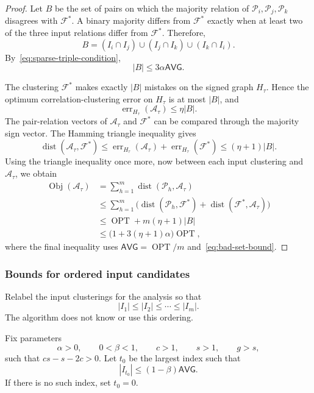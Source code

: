 \documentclass[11pt]{article}
\theoremstyle{definition}
\theoremstyle{remark}
\newcommand{\A}{\mathcal A}
\newcommand{\F}{\mathcal F}
\newcommand{\Pp}{\mathcal P}
\newcommand{\OPT}{\operatorname{OPT}}
\newcommand{\Obj}{\operatorname{Obj}}
\newcommand{\err}{\operatorname{err}}
\newcommand{\dist}{\operatorname{dist}}
\newcommand{\1}{\mathbf 1}
\begin{document}
\begin{proof}
Let $B$ be the set of pairs on which the majority relation of
$\Pp_i,\Pp_j,\Pp_k$ disagrees with $\F^*$.  A binary majority differs from
$\F^*$ exactly when at least two of the three input relations differ from
$\F^*$.  Therefore,
\begin{equation}\label{eq:bad-set-union}
 B=(I_i\cap I_j)\cup(I_j\cap I_k)\cup(I_k\cap I_i).
\end{equation}
By~\eqref{eq:sparse-triple-condition},
\begin{equation}\label{eq:bad-set-bound}
 |B|\le3\alpha\mathsf{AVG}.
\end{equation}

The clustering $\F^*$ makes exactly $|B|$ mistakes on the signed graph
$H_\tau$.  Hence the optimum correlation-clustering error on $H_\tau$ is at
most $|B|$, and
\[
  \err_{H_\tau}(\A_\tau)\le\eta|B|.
\]
The pair-relation vectors of $\A_\tau$ and $\F^*$ can be compared through
the majority sign vector.  The Hamming triangle inequality gives
\begin{equation}\label{eq:distance-through-majority}
 \dist(\A_\tau,\F^*)
 \le
 \err_{H_\tau}(\A_\tau)+\err_{H_\tau}(\F^*)
 \le(\eta+1)|B|.
\end{equation}
Using the triangle inequality once more, now between each input clustering
and $\A_\tau$, we obtain
\begin{align*}
 \Obj(\A_\tau)
 &=\sum_{h=1}^m\dist(\Pp_h,\A_\tau)\\
 &\le\sum_{h=1}^m
       \bigl(\dist(\Pp_h,\F^*)+\dist(\F^*,\A_\tau)\bigr)\\
 &\le\OPT+m(\eta+1)|B|\\
 &\le\bigl(1+3(\eta+1)\alpha\bigr)\OPT,
\end{align*}
where the final inequality uses
$\mathsf{AVG}=\OPT/m$ and~\eqref{eq:bad-set-bound}.
\end{proof}

\subsubsection{Bounds for ordered input candidates}

Relabel the input clusterings for the analysis so that
\begin{equation}\label{eq:ordered-errors}
  |I_1|\le|I_2|\le\cdots\le|I_m|.
\end{equation}
The algorithm does not know or use this ordering.

Fix parameters
\[
  \alpha>0,\qquad 0<\beta<1,\qquad c>1,\qquad s>1,
  \qquad g>s,
\]
such that $cs-s-2c>0$.  Let $t_0$ be the largest index such that
\begin{equation}\label{eq:low-inputs}
  |I_{t_0}|\le(1-\beta)\mathsf{AVG}.
\end{equation}
If there is no such index, set $t_0=0$.
\end{document}
